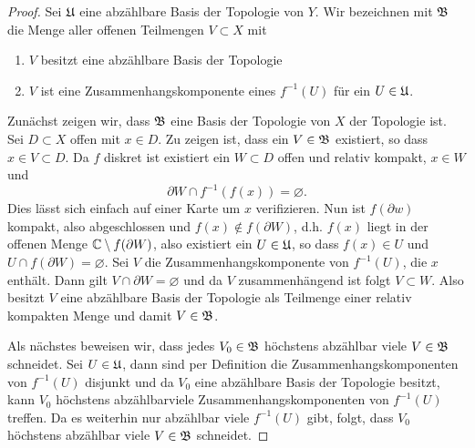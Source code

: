 \begin{proof}
  Sei $\mathfrak{U}$ eine abzählbare Basis der Topologie von $Y$. 
  Wir bezeichnen mit $\mathfrak{B}$ die Menge aller offenen Teilmengen $V \subset X$
  mit
  \begin{enumerate}
  \item $V$ besitzt eine abzählbare Basis der Topologie
  \item $V$ ist eine Zusammenhangskomponente eines $f^{-1}(U)$ für ein
    $U \in \mathfrak{U}$.
  \end{enumerate}
  Zunächst zeigen wir, dass $\mathfrak{B}$ eine Basis der Topologie von $X$ der
  Topologie ist.
  Sei $D \subset X$ offen mit $x \in D$. Zu zeigen ist, dass ein $V
  \in \mathfrak{B}$ existiert, so dass $x \in V \subset D$. 
  Da $f$ diskret ist existiert ein $W \subset D$ offen und relativ
  kompakt, $x \in W$ und
  \[
  \partial W \cap f^{-1}(f(x)) = \varnothing.
  \]
  Dies lässt sich einfach auf einer Karte um $x$
  verifizieren. 
  Nun ist $f(\partial w)$ kompakt, also abgeschlossen und $f(x)
  \notin f(\partial W)$, d.h. $f(x)$ liegt in der offenen Menge $\mathbb{C}
  \setminus f(\partial W)$, also existiert ein $U \in \mathfrak{U}$, so dass
  $f(x) \in U$ und $U \cap f(\partial W) = \varnothing$. Sei  $V$
  die Zusammenhangskomponente von $f^{-1}(U)$, die $x$ enthält. Dann
  gilt $V \cap \partial W = \varnothing$ und da $V$ zusammenhängend
  ist folgt $V \subset W$. Also besitzt $V$ eine abzählbare Basis
  der Topologie als Teilmenge einer relativ kompakten Menge und
  damit $V \in \mathfrak{B}$.
  
  Als nächstes beweisen wir, dass jedes $V_0 \in \mathfrak{B}$ höchstens abzählbar
  viele $V \in \mathfrak{B}$ schneidet.
  Sei $U \in \mathfrak{U}$, dann sind per Definition die
  Zusammenhangskomponenten von $f^{-1}(U)$ disjunkt und da $V_0$
  eine abzählbare Basis der Topologie besitzt, kann $V_0$ höchstens
  abzählbarviele Zusammenhangskomponenten von $f^{-1}(U)$
  treffen. Da es weiterhin nur abzählbar viele $f^{-1}(U)$ gibt, folgt, dass
  $V_0$ höchstens abzählbar viele $V \in \mathfrak{B}$ schneidet.
  

\end{proof}
